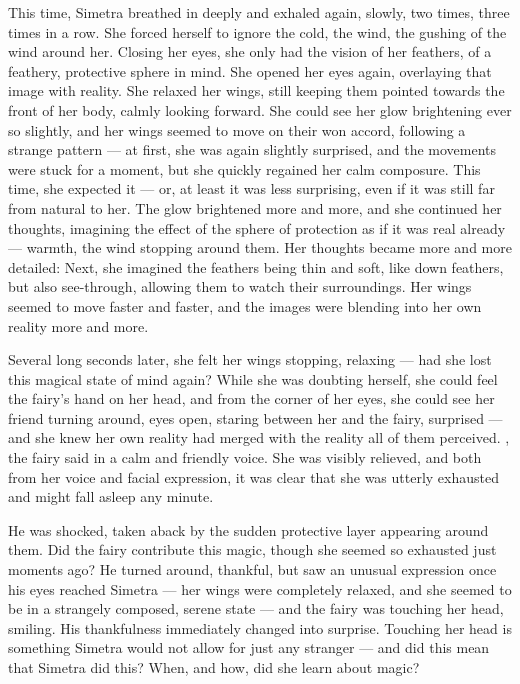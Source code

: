 This time, Simetra breathed in deeply and exhaled again, slowly, two times, three times in a row. She forced herself to ignore the cold, the wind, the gushing of the wind around her. Closing her eyes, she only had the vision of her feathers, of a feathery, protective sphere in mind. She opened her eyes again, overlaying that image with reality. She relaxed her wings, still keeping them pointed towards the front of her body, calmly looking forward. She could see her glow brightening ever so slightly, and her wings seemed to move on their won accord, following a strange pattern --- at first, she was again slightly surprised, and the movements were stuck for a moment, but she quickly regained her calm composure. This time, she expected it --- or, at least it was less surprising, even if it was still far from natural to her. The glow brightened more and more, and she continued her thoughts, imagining the effect of the sphere of protection as if it was real already --- warmth, the wind stopping around them. Her thoughts became more and more detailed: Next, she imagined the feathers being thin and soft, like down feathers, but also see-through, allowing them to watch their surroundings. Her wings seemed to move faster and faster, and the images were blending into her own reality more and more.

Several long seconds later, she felt her wings stopping, relaxing --- had she lost this magical state of mind again? While she was doubting herself, she could feel the fairy's hand on her head, and from the corner of her eyes, she could see her friend turning around, eyes open, staring between her and the fairy, surprised --- and she knew her own reality had merged with the reality all of them perceived. , the fairy said in a calm and friendly voice. She was visibly relieved, and both from her voice and facial expression, it was clear that she was utterly exhausted and might fall asleep any minute.

\fancybreaker{}

He was shocked, taken aback by the sudden protective layer appearing around them. Did the fairy contribute this magic, though she seemed so exhausted just moments ago? He turned around, thankful, but saw an unusual expression once his eyes reached Simetra --- her wings were completely relaxed, and she seemed to be in a strangely composed, serene state --- and the fairy was touching her head, smiling. His thankfulness immediately changed into surprise. Touching her head is something Simetra would not allow for just any stranger --- and did this mean that Simetra did this? When, and how, did she learn about magic?

